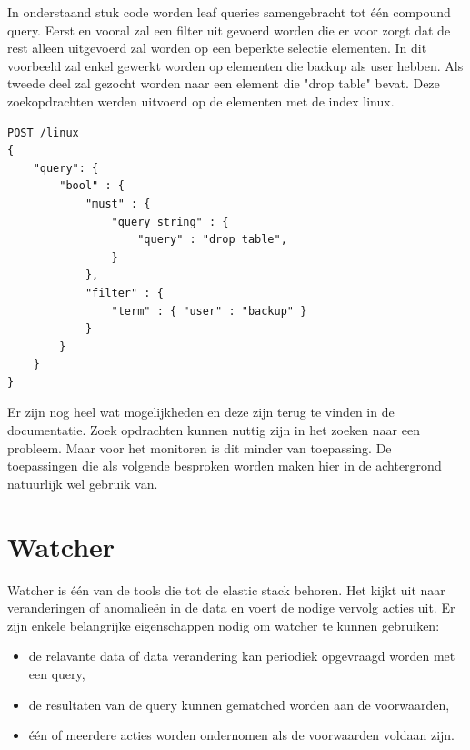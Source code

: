 In onderstaand stuk code worden leaf queries samengebracht tot één compound query. Eerst en vooral zal een filter uit gevoerd worden die er voor zorgt dat de rest alleen uitgevoerd zal worden op een beperkte selectie elementen.
In dit voorbeeld zal enkel gewerkt worden op elementen die backup als user hebben.
Als tweede deel zal gezocht worden naar een element die "drop table" bevat. 
Deze zoekopdrachten werden uitvoerd op de elementen met de index linux.


\lstset{escapechar=@,style=customc}  
\begin{lstlisting}[frame=single]  
POST /linux
{
    "query": {
        "bool" : {
            "must" : {
                "query_string" : {
                    "query" : "drop table",
                }
            },
            "filter" : {
                "term" : { "user" : "backup" }
            }
        }
    }
}
\end{lstlisting}

Er zijn nog heel wat mogelijkheden en deze zijn terug te vinden in de documentatie. 
Zoek opdrachten kunnen nuttig zijn in het zoeken naar een probleem. Maar voor het monitoren is dit minder van toepassing.
De toepassingen die als volgende besproken worden maken hier in de achtergrond natuurlijk wel gebruik van.

\section{Watcher}
\label{sec:watcher}

Watcher is één van de tools die tot de elastic stack behoren. Het kijkt uit naar veranderingen of anomalieën in de data en voert de nodige vervolg acties uit. Er zijn enkele belangrijke eigenschappen nodig om watcher te kunnen gebruiken:
\begin{itemize}
	\item de relavante data of data verandering kan periodiek opgevraagd worden met een query,
   
   \item de resultaten van de query kunnen gematched worden aan de voorwaarden,

	\item één of meerdere acties worden ondernomen als de voorwaarden voldaan zijn.
\end{itemize}

